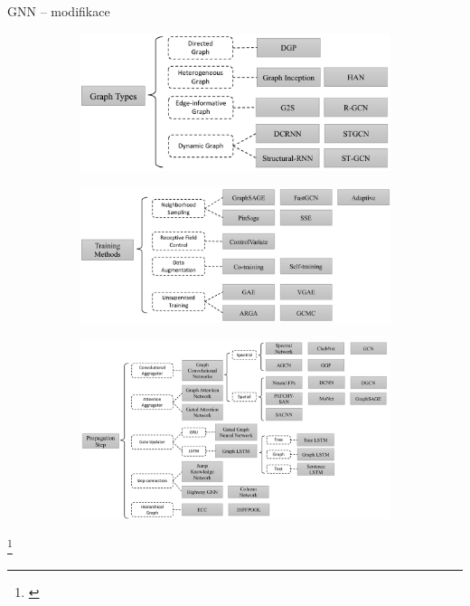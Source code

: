 \documentclass[10pt]{beamer}
\begin{document}
\begin{frame}{GNN -- modifikace}
	\begin{figure}[h]
		\centering
		\begin{subfigure}[t]{0.33\textwidth}
			\centering
			\includegraphics[width=1\linewidth]{images/GNN-variants/variant1.pdf}
		\end{subfigure}
		\begin{subfigure}[t]{0.43\textwidth}
			\centering
			\includegraphics[width=1\linewidth]{images/GNN-variants/variant3.pdf}
		\end{subfigure}
		\begin{subfigure}[t]{0.65\textwidth}
			\centering
			\includegraphics[width=1\linewidth]{images/GNN-variants/variant2.pdf}
		\end{subfigure}
	\end{figure}\footnote{\cite{zhou_graph_2019}}
\end{frame}
\end{document}
